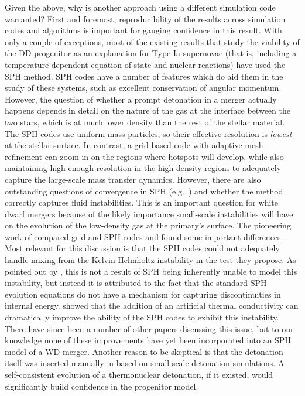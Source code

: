 \documentclass{emulateapj}
\begin{document}
Given the above, why is another approach using a different simulation
code warranted? First and foremost, reproducibility of the results
across simulation codes and algorithms is important for gauging
confidence in this result. With only a couple of exceptions, most of
the existing results that study the viability of the DD progenitor as
an explanation for Type Ia supernovae (that is, including a
temperature-dependent equation of state and nuclear reactions) have
used the SPH method. SPH codes have a number of features which do aid
them in the study of these systems, such as excellent conservation of
angular momentum. However, the question of whether a prompt detonation
in a merger actually happens depends in detail on the nature of the
gas at the interface between the two stars, which is at much lower
density than the rest of the stellar material. The SPH codes use
uniform mass particles, so their effective resolution is
\textit{lowest} at the stellar surface. In contrast, a grid-based code
with adaptive mesh refinement can zoom in on the regions where
hotspots will develop, while also maintaining high enough resolution
in the high-density regions to adequately capture the large-scale mass
transfer dynamics. However, there are also outstanding questions of
convergence in SPH (e.g.\ \citealt{zhu_SPH:2014}) and whether the method
correctly captures fluid instabilities. This is an important question
for white dwarf mergers because of the likely importance small-scale
instabilities will have on the evolution of the low-density gas at the
primary's surface. The pioneering work of \cite{agertz:2007} compared
grid and SPH codes and found some important differences. Most relevant
for this discussion is that the SPH codes could not adequately handle
mixing from the Kelvin-Helmholtz instability in the test they
propose. As pointed out by \cite{price:2008}, this is not a result of
SPH being inherently unable to model this instability, but instead it
is attributed to the fact that the standard SPH evolution equations do
not have a mechanism for capturing discontinuities in internal
energy. \citeauthor{price:2008} showed that the addition of an
artificial thermal conductivity can dramatically improve the ability
of the SPH codes to exhibit this instability. There have since been a
number of other papers discussing this issue, but to our knowledge
none of these improvements have yet been incorporated into an SPH
model of a WD merger. Another reason to be skeptical is that the
detonation itself was inserted manually in \cite{pakmor:2010} based on
small-scale detonation simulations. A self-consistent evolution of a
thermonuclear detonation, if it existed, would significantly build
confidence in the progenitor model.
\end{document}
